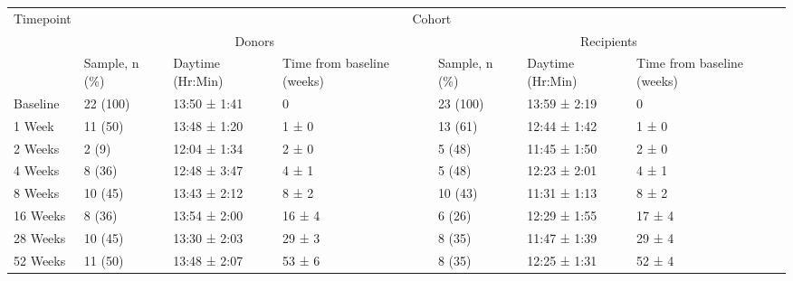 \begin{tabular}{lp{1.5cm}p{2cm}p{1.5cm}p{1.5cm}p{2cm}p{1.5cm}}
\toprule
\multicolumn{1}{c}{\multirow{3}{*}{Timepoint}} & \multicolumn{6}{c}{Cohort} \\
\cmidrule(l){2-7}
\multicolumn{1}{c}{} & \multicolumn{3}{c}{Donors} & \multicolumn{3}{c}{Recipients} \\
\cmidrule(l){2-4}\cmidrule(l){5-7}
\multicolumn{1}{c}{} & Sample, n (\%) & Daytime (Hr:Min) & Time from baseline (weeks) & Sample, n (\%) & Daytime (Hr:Min) & Time from baseline (weeks) \\
\midrule
Baseline & 22 (100) & 13:50 ± 1:41 & 0 & 23 (100) & 13:59 ± 2:19 & 0 \\
1 Week & 11 (50) & 13:48 ± 1:20 & 1 ± 0 & 13 (61) & 12:44 ± 1:42 & 1 ± 0 \\
2 Weeks & 2 (9) & 12:04 ± 1:34 & 2 ± 0 & 5 (48) & 11:45 ± 1:50 & 2 ± 0 \\
4 Weeks & 8 (36) & 12:48 ± 3:47 & 4 ± 1 & 5 (48) & 12:23 ± 2:01 & 4 ± 1 \\
8 Weeks & 10 (45) & 13:43 ± 2:12 & 8 ± 2 & 10 (43) & 11:31 ± 1:13 & 8 ± 2 \\
16 Weeks & 8 (36) & 13:54 ± 2:00 & 16 ± 4 & 6 (26) & 12:29 ± 1:55 & 17 ± 4 \\
28 Weeks & 10 (45) & 13:30 ± 2:03 & 29 ± 3 & 8 (35) & 11:47 ± 1:39 & 29 ± 4 \\
52 Weeks & 11 (50) & 13:48 ± 2:07 & 53 ± 6 & 8 (35) & 12:25 ± 1:31 & 52 ± 4\\
\bottomrule
\end{tabular}
